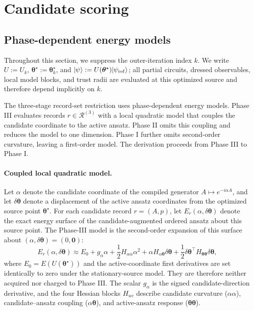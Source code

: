 \documentclass[
  reprint,
  amsmath,
  amssymb,
  aps,
  pra,
  nofootinbib,
  superscriptaddress,
  floatfix
]{revtex4-2}
\newcommand{\ket}[1]{|#1\rangle}
\begin{document}
\section{Candidate scoring}
\subsection{Phase-dependent energy models}
\label{subsec:candidate_energy_models}
%
Throughout this section, we suppress the outer-iteration index \(k\). We write
\(U:=U_k\), \(\boldsymbol\theta^\star:=\boldsymbol\theta_k^\star\), and
\(\ket{\psi}:=U(\boldsymbol\theta^\star)\ket{\psi_{\rm ref}}\); all partial
circuits, dressed observables, local model blocks, and trust radii are evaluated
at this optimized source and therefore depend implicitly on \(k\).

The three-stage record-set restriction uses phase-dependent energy models.
Phase III evaluates records \(r\in\mathcal R^{(3)}\) with a local quadratic
model that couples the candidate coordinate to the active ansatz. Phase II
omits this coupling and reduces the model to one dimension. Phase I further
omits second-order curvature, leaving a first-order model. The derivation
proceeds from Phase III to Phase I.
\paragraph*{Coupled local quadratic model.}
%
Let \(\alpha\) denote the candidate coordinate of the compiled generator
\(A\mapsto e^{-i\alpha A}\), and let \(\delta\boldsymbol{\theta}\) denote a
displacement of the active ansatz coordinates from the optimized source point
\(\boldsymbol{\theta}^\star\). For each candidate record \(r=(A,p)\), let
\(E_r(\alpha,\delta\boldsymbol{\theta})\) denote the exact energy surface of
the candidate-augmented ordered ansatz about this source point.
The Phase-III model is the second-order expansion of this surface about
\((\alpha,\delta\boldsymbol{\theta})=(0,\mathbf 0)\):
\begin{equation}
E_r(\alpha,\delta\boldsymbol{\theta})
\approx
E_0
+ g_{\alpha}\alpha
+ \frac{1}{2}H_{\alpha\alpha}\alpha^2
+ \alpha H_{\alpha\boldsymbol\theta}\delta\boldsymbol{\theta}
+ \frac{1}{2}\delta\boldsymbol{\theta}^{\top}
H_{\boldsymbol\theta\boldsymbol\theta}\delta\boldsymbol{\theta},
\label{eq:local_quadratic}
\end{equation}
where \(E_0=E(U(\boldsymbol\theta^\star))\) and the active-coordinate first
derivatives are set identically to zero under the stationary-source model. They
are therefore neither acquired nor charged to Phase III. The scalar \(g_\alpha\)
is the signed candidate-direction derivative,
and the four Hessian blocks $H_{uv}$ describe
candidate curvature ($\alpha\alpha$), candidate--ansatz coupling
($\alpha\boldsymbol\theta$), and active-ansatz response
($\boldsymbol\theta\boldsymbol\theta$).
\end{document}
